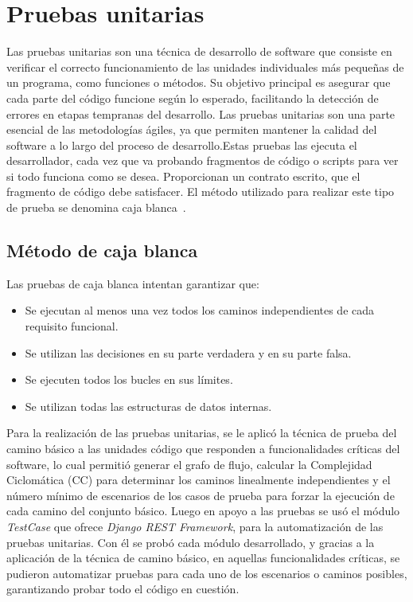 \section{Pruebas unitarias}

Las pruebas unitarias son una técnica de desarrollo de software que consiste en verificar el correcto funcionamiento de las unidades individuales más pequeñas de un programa, como funciones o métodos. Su objetivo principal es asegurar que cada parte del código funcione según lo esperado, facilitando la detección de errores en etapas tempranas del desarrollo. Las pruebas unitarias son una parte esencial de las metodologías ágiles, ya que permiten mantener la calidad del software a lo largo del proceso de desarrollo.Estas pruebas las ejecuta el desarrollador, cada vez que va probando fragmentos de código
o scripts para ver si todo funciona como se desea. Proporcionan un contrato escrito, que el fragmento de código debe satisfacer. El método utilizado para realizar este tipo de prueba se denomina caja
blanca~\cite{sommerville2011software}.

\subsection{Método de caja blanca}

Las pruebas de caja blanca intentan garantizar que:

\begin{itemize}
	\item Se ejecutan al menos una vez todos los caminos independientes de cada requisito funcional.
	\item Se utilizan las decisiones en su parte verdadera y en su parte falsa.
	\item Se ejecuten todos los bucles en sus límites.
	\item Se utilizan todas las estructuras de datos internas.
\end{itemize}

Para la realización de las pruebas unitarias, se le aplicó la técnica de prueba del camino básico a las unidades
código que responden a funcionalidades críticas del software, lo cual permitió generar el grafo de flujo,
calcular la Complejidad Ciclomática (CC) para determinar los caminos linealmente independientes y el
número mínimo de escenarios de los casos de prueba para forzar la ejecución de cada camino del conjunto
básico.
Luego en apoyo a las pruebas se usó el módulo \textit{TestCase} que ofrece \textit{Django REST Framework}, para la automatización de las pruebas unitarias. Con él se probó cada módulo desarrollado, y gracias a la aplicación de la
técnica de camino básico, en aquellas funcionalidades críticas, se pudieron automatizar pruebas para cada
uno de los escenarios o caminos posibles, garantizando probar todo el código en cuestión.


